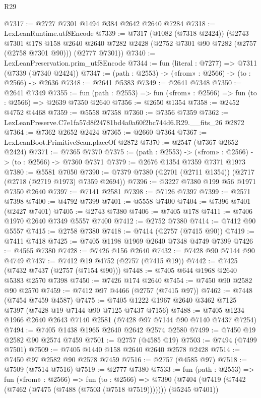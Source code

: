 \begin{lexlean}{R29}
\begin{coremodule}
@7317 := @2727 @7301 @1494 @384 @2642 @2640 @7284
@7318 := LexLeanRuntime.utf8Encode
@7339 := @7317
    (@1082 (@7318 @2424))
    (@2743
      @7301
      @178
      @158
      @2640
      @2640
      @7282
      @2428
      (@2752 @7301 @90 @7282 (@2757 (@2758 @7301 @90)))
      (@2777 @7301))
@7340 := LexLeanPreservation.prim_utf8Encode
@7344 := fun (literal : @7277) => @7311 (@7339 (@7340 @2424))
@7347 := (path : @2553) -> («from» : @2566) -> (to : @2566) -> @2636
@7348 := @2641 @5383
@7349 := @2641 @7348
@7350 := @2641 @7349
@7355 := fun (path : @2553) => fun («from» : @2566) => fun (to : @2566) => @2639 @7350 @2640
@7356 := @2650 @1354
@7358 := @2452 @4752 @4468
@7359 := @5558 @7358
@7360 := @7356 @7359
@7362 := LexLeanPreserve.C7e1fa57d8f24781bd4a0a60f2bc744d6.R29.__fits_26 @2872
@7364 := @7362 @2652 @2424
@7365 := @2660 @7364
@7367 := LexLeanBoot.PrimitiveScan.placeOf @2872
@7370 := @2547 (@7367 @2652 @2424)
@7371 := @7365 @7370
@7375 := (path : @2553) -> («from» : @2566) -> (to : @2566) -> @7360 @7371
@7379 := @2676 @1354 @7359 @7371 @1973
@7380 := @5581 @7050
@7390 := @7379 @7380 (@2701 (@2711 @1354)) (@2717 (@2718 (@2719 @1973) @7359 @2694))
@7396 := @3227 @7380 @199 @56 @1971 @7350 @2640
@7397 := @7141 @2581
@7398 := @7126 @7397
@7399 := @2571 @7398
@7400 := @4792 @7399
@7401 := @5558 @7400
@7404 := @7396 @7401 (@2427 @7401)
@7405 := @2743 @7380
@7406 := @7405 @178
@7411 := @7406 @1970 @2640 @7349 @5557 @7400
@7412 := @2752 @7380
@7414 := @7412 @90 @5557
@7415 := @2758 @7380
@7418 := @7414 (@2757 (@7415 @90))
@7419 := @7411 @7418
@7425 := @7405 @1198 @1969 @2640 @7348 @4749 @7399
@7426 := @4565 @7380
@7428 := @7426 @156 @2640
@7432 := @7428 @90 @7144 @90 @4749
@7437 := @7412 @19 @4752 (@2757 (@7415 @19))
@7442 := @7425 (@7432 @7437 (@2757 (@7154 @90)))
@7448 := @7405 @644 @1968 @2640 @5383 @2570 @7398
@7450 := @7426 @174 @2640
@7454 := @7450 @90 @2582 @90 @2570
@7459 := @7412 @97 @4466 (@2757 (@7415 @97))
@7462 := @7448 (@7454 @7459 @4587)
@7475 := @7405 @1222 @1967 @2640 @3462 @7125 @7397 (@7428 @19 @7144 @90 @7125 @7437 @7156)
@7488 := @7405 @1234 @1966 @2640 @2643 @7140 @2581 (@7428 @97 @7144 @90 @7140 @7437 @7254)
@7494 := @7405 @1438 @1965 @2640 @2642 @2574 @2580
@7499 := @7450 @19 @2582 @90 @2574 @7459
@7501 := @2757 (@4585 @19)
@7503 := @7494 (@7499 @7501)
@7509 := @7405 @1440 @158 @2640 @2640 @2578 @2428
@7514 := @7450 @97 @2582 @90 @2578 @7459
@7516 := @2757 (@4585 @97)
@7518 := @7509 (@7514 @7516)
@7519 := @2777 @7380
@7533 := fun (path : @2553) =>
  fun («from» : @2566) =>
  fun (to : @2566) =>
  @7390 (@7404 (@7419 (@7442 (@7462 (@7475 (@7488 (@7503 (@7518 @7519))))))) (@5245 @7401))

\end{coremodule}
\end{lexlean}
